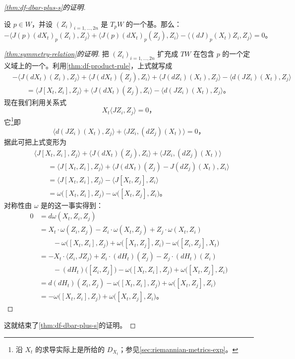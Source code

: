\begin{proof}[\cref{thm:df-dbar-plus-s}的证明]
\begin{lemma}\label{thm:symmetry-relation}
设 $p\in W$，并设 $(Z_i)_{i=1,\dots,2n}$ 是 $T_pW$ 的一个\trUnitary{}基。那么：
\[
-\bigl\langle J(p)(dX_t)_p(Z_i),Z_j\bigr\rangle+\bigl\langle J(p)(dX_t)_p(Z_j),Z_i\bigr\rangle-\bigl\langle(dJ)_p(X_t)Z_i,Z_j\bigr\rangle=0\text{。}
\]
\end{lemma}

\begin{proof}[\cref{thm:symmetry-relation}的证明]
把 $(Z_i)_{i=1,\dots,2n}$ 扩充成 $TW$ 在包含 $p$ 的一个\trChart{}定义域上的一个\trUnitary{}\trFrame。利用\cref{thm:df-product-rule}，上式就写成
\[
\begin{aligned}
&-\bigl\langle J(dX_t)(Z_i),Z_j\bigr\rangle+\bigl\langle J(dX_t)(Z_j),Z_i\bigr\rangle+\bigl\langle J(dZ_i)(X_t),Z_j\bigr\rangle-\bigl\langle d(JZ_i)(X_t),Z_j\bigr\rangle\\
&\qquad=\bigl\langle J[X_t,Z_i],Z_j\bigr\rangle+\bigl\langle J(dX_t)(Z_j),Z_i\bigr\rangle-\bigl\langle d(JZ_i)(X_t),Z_j\bigr\rangle\text{。}
\end{aligned}
\]
现在我们利用关系式
\[
X_t\bigl\langle JZ_i,Z_j\bigr\rangle=0\text{，}
\]
它\footnote{沿 $X_t$ 的求导实际上是\trLeviCivita{}\trConnection{}所给的\trDerivation{} $D_{X_t}$；参见\cref{sec:riemannian-metrics-exp}。}即
\[
\bigl\langle d(JZ_i)(X_t),Z_j\bigr\rangle+\bigl\langle JZ_i,(dZ_j)(X_t)\bigr\rangle=0\text{，}
\]
据此可把上式变形为
\[
\begin{aligned}
&\bigl\langle J[X_t,Z_i],Z_j\bigr\rangle+\bigl\langle J(dX_t)(Z_j),Z_i\bigr\rangle+\bigl\langle JZ_i,(dZ_j)(X_t)\bigr\rangle\\
&\qquad=\bigl\langle J[X_t,Z_i],Z_j\bigr\rangle+\bigl\langle J(dX_t)(Z_j)-J(dZ_j)(X_t),Z_i\bigr\rangle\\
&\qquad=\bigl\langle J[X_t,Z_i],Z_j\bigr\rangle-\bigl\langle J[X_t,Z_j],Z_i\bigr\rangle\\
&\qquad=\omega\bigl([X_t,Z_i],Z_j\bigr)-\omega\bigl([X_t,Z_j],Z_i\bigr)\text{。}
\end{aligned}
\]
对称性由\trForm{} $\omega$ 是\trClosed{}的这一事实得到：
\[
\begin{aligned}
0&=d\omega(X_t,Z_i,Z_j)\\
&=X_t\cdot\omega(Z_i,Z_j)-Z_i\cdot\omega(X_t,Z_j)+Z_j\cdot\omega(X_t,Z_i)\\
&\qquad-\omega\bigl([X_t,Z_i],Z_j\bigr)+\omega\bigl([X_t,Z_j],Z_i\bigr)-\omega\bigl([Z_i,Z_j],X_t\bigr)\\
&=-X_t\cdot\bigl\langle Z_i,JZ_j\bigr\rangle+Z_i\cdot(dH_t)(Z_j)-Z_j\cdot(dH_t)(Z_i)\\
&\qquad-(dH_t)\bigl([Z_i,Z_j]\bigr)-\omega\bigl([X_t,Z_i],Z_j\bigr)+\omega\bigl([X_t,Z_j],Z_i\bigr)\\
&=d(dH_t)(Z_i,Z_j)-\omega\bigl([X_t,Z_i],Z_j\bigr)+\omega\bigl([X_t,Z_j],Z_i\bigr)\\
&=-\omega\bigl([X_t,Z_i],Z_j\bigr)+\omega\bigl([X_t,Z_j],Z_i\bigr)\text{。}
\end{aligned}
\]
\end{proof}

这就结束了\cref{thm:df-dbar-plus-s}的证明。
\end{proof}

